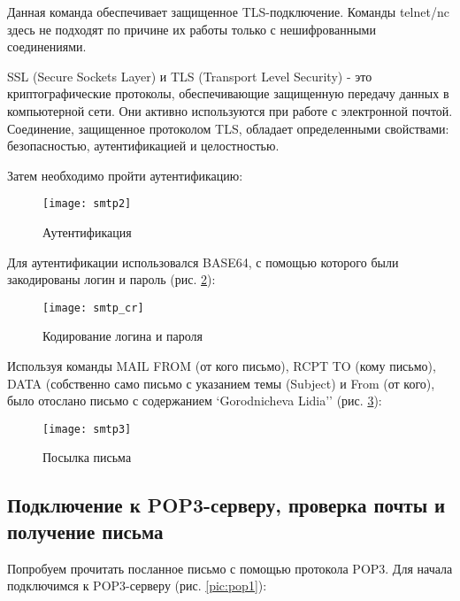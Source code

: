 Данная команда обеспечивает защищенное TLS-подключение. Команды telnet/nc здесь не подходят по причине их работы только с нешифрованными соединениями.  

SSL (Secure Sockets Layer) и TLS (Transport Level Security) - это криптографические протоколы, обеспечивающие защищенную передачу данных в компьютерной сети. Они активно используются при работе с электронной почтой. Соединение, защищенное протоколом TLS, обладает определенными свойствами: безопасностью, аутентификацией и целостностью. 

Затем необходимо пройти аутентификацию:

\begin{figure}[H]
	\begin{center}
		\texttt{[image: smtp2]}
		\caption{Аутентификация} 
		\label{pic:smtp2} %
	\end{center}
\end{figure}

Для аутентификации использовался BASE64, с помощью которого были закодированы логин и пароль (рис. \ref{pic:smtp_cr}):

\begin{figure}[H]
	\begin{center}
		\texttt{[image: smtp\_cr]}
		\caption{Кодирование логина и пароля} 
		\label{pic:smtp_cr} %
	\end{center}
\end{figure}

 Используя команды MAIL FROM (от кого письмо), RCPT TO (кому письмо), DATA (собственно само письмо с указанием темы (Subject) и From (от кого), было отослано письмо с содержанием `Gorodnicheva Lidia'' (рис. \ref{pic:smtp3}):

\begin{figure}[H]
	\begin{center}
		\texttt{[image: smtp3]}
		\caption{Посылка письма} 
		\label{pic:smtp3} %
	\end{center}
\end{figure}

\subsection{Подключение к POP3-серверу, проверка почты и получение письма}

Попробуем прочитать посланное письмо с помощью протокола POP3. Для начала подключимся к POP3-серверу (рис. \ref{pic:pop1}):

